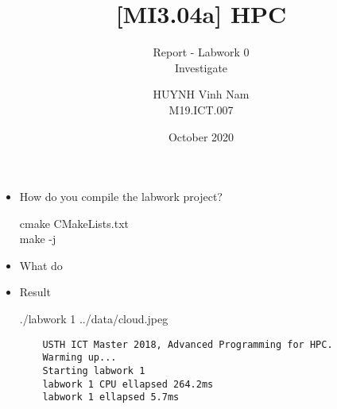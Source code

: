 \documentclass[10pt, a4paper]{article}
\title{[MI3.04a] HPC}
\subtitle{Report - Labwork 0 \\ Investigate}
\author{HUYNH Vinh Nam \\ M19.ICT.007}
\date{October 2020}
\begin{document}
\maketitle

\begin{itemize}
    \item How do you compile the labwork project?
    
    \vspace{1mm}
    cmake CMakeLists.txt \\
    make -j
    \item What do

    \item Result 
    
    \vspace{1mm}
    ./labwork 1 ../data/cloud.jpeg
    \begin{verbatim}
    USTH ICT Master 2018, Advanced Programming for HPC. 
    Warming up... 
    Starting labwork 1
    labwork 1 CPU ellapsed 264.2ms
    labwork 1 ellapsed 5.7ms
        
    \end{verbatim}
    
\end{itemize}
\end{document}
